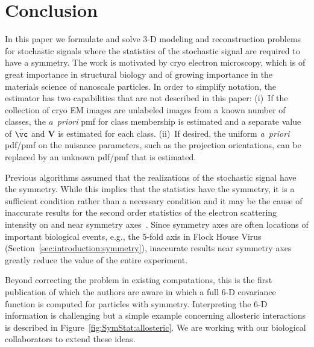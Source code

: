 \section{Conclusion}
\label{sec:conc}
In this paper we formulate and solve 3-D modeling and reconstruction
problems for stochastic signals where the statistics of the stochastic
signal are required to have a symmetry.
The work is motivated by cryo electron microscopy, which is of great
importance in structural biology and of growing importance in the materials
science of nanoscale particles.
In order to simplify notation, the estimator has two capabilities that are
not described in this paper:
(i)~If the collection of cryo EM images are unlabeled images from a known
number of classes, the {\em a~priori} pmf for class membership is estimated
and a separate value of $\bar{\vc}$ and $\mathbf{V}$ is estimated for each class.
(ii)~If desired, the uniform {\em a~priori} pdf/pmf on the nuisance
parameters, such as the projection orientations, can be replaced by an
unknown pdf/pmf that is estimated.
\par
Previous algorithms assumed that the realizations of the stochastic signal
have the symmetry.
While this implies that the statistics have the symmetry, it is a
sufficient condition rather than a necessary condition and it may be the
cause of inaccurate results for the second order statistics of the electron
scattering intensity on and near symmetry
axes~\cite[p.~173]{Ludtke.MethodsEnzymology.2016}.
Since symmetry axes are often locations of important biological events,
e.g., the 5-fold axis in Flock House Virus
(Section~\ref{sec:introduction:symmetry}),
inaccurate results near symmetry axes greatly reduce the value of the
entire experiment.
\par
Beyond correcting the problem in existing computations, this is the first
publication of which the authors are aware in which a full 6-D covariance
function is computed for particles with symmetry.
Interpreting the 6-D information is challenging but a simple example
concerning allosteric interactions is described in
Figure~\ref{fig:SymStat:allosteric}.
We are working with our biological collaborators to extend these
ideas.
\appendices
